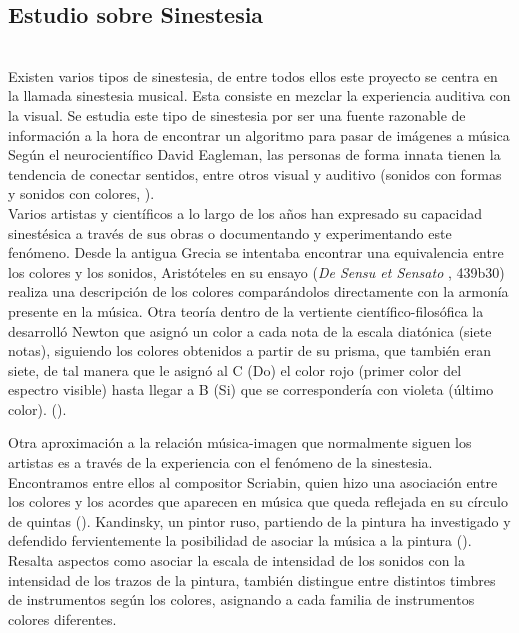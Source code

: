 \subsection{Estudio sobre Sinestesia}
\label{subsubsec:estudioSinestesia}

\\

\color{blue} Existen varios tipos de sinestesia, de entre todos ellos este proyecto se centra en la llamada sinestesia musical. Esta consiste en mezclar la experiencia auditiva con la visual. Se estudia este tipo de sinestesia por ser una fuente razonable de información a la hora de encontrar un algoritmo para pasar de imágenes a música \color{black}
\\Según el neurocientífico David Eagleman, las personas de forma innata tienen la tendencia de conectar sentidos, entre otros visual y auditivo (sonidos con formas y sonidos con colores, \cite{VideoRedesFliparColores}).\\

Varios artistas y científicos a lo largo de los años han expresado su capacidad sinestésica a través de sus obras o documentando y experimentando este fenómeno. Desde la antigua Grecia se intentaba encontrar una equivalencia entre los colores y los sonidos, Aristóteles en su ensayo (\emph{De Sensu et Sensato} \cite{DeSensuEtSensato}, 439b30) realiza una descripción de los colores comparándolos directamente con la armonía presente en la música. \color{blue}Otra teoría dentro de la vertiente científico-filosófica la desarrolló Newton que asignó un color a cada nota de la escala diatónica (siete notas), siguiendo los colores obtenidos a partir de su prisma, que también eran siete, de tal manera que le asignó al C (Do) el color rojo (primer color del espectro visible) hasta llegar a B (Si) que se correspondería con violeta (último color). (\cite{OpticksNewton}).\\ \color{black}

Otra aproximación a la relación música-imagen que normalmente siguen los artistas es a través de la experiencia con el fenómeno de la sinestesia. Encontramos entre ellos al compositor Scriabin, quien hizo una asociación entre los colores y los acordes que aparecen en música que queda reflejada en su círculo de quintas (\cite{ScriabinQuintasColor}). Kandinsky, un pintor ruso, partiendo de la pintura ha investigado y defendido fervientemente la posibilidad de asociar la música a la pintura (\cite{ConcerningSpiritualArt}). \color{blue} Resalta aspectos como asociar la escala de intensidad de los sonidos con la intensidad de los trazos de la pintura, también distingue entre distintos timbres de instrumentos según los colores, asignando a cada familia de instrumentos colores diferentes.\\ \color{black}

